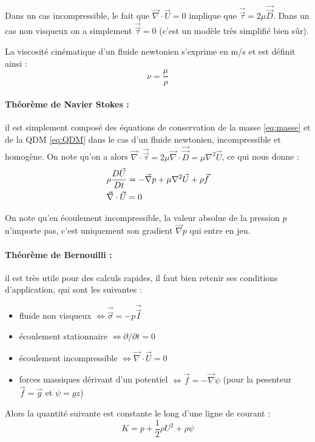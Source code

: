 Dans un cas incompressible, le fait que $\vec{\nabla} \cdot \vec{U} = 0$ implique que $\vec{\vec{\tau}} = 2 \mu \vec{\vec{D}}$. Dans un cas non visqueux on a simplement $\vec{\vec{\tau}} = 0$ (c'est un modèle très simplifié bien sûr).


La viscosité cinématique d'un fluide newtonien s'exprime en m/s et est définit ainsi :
%
\begin{equation}
    \nu = \frac{\mu}{\rho}
\end{equation}

\paragraph{Théorème de Navier Stokes :}il est simplement composé des équations de conservation de la masse \eqref{eq:masse} et de la QDM \eqref{eq:QDM} dans le cas d'un fluide newtonien, incompressible et homogène. On note qu'on a alors $\vec{\nabla} \cdot \vec{\vec{\tau}} = 2 \mu \vec{\nabla} \cdot \vec{\vec{D}} = \mu \nabla^2 \vec{U}$, ce qui nous donne :
%
\begin{align}[left=\empheqlbrace]
    \label{eq:navierstokes}  %
    & \rho \frac{D\vec{U}}{Dt} = - \vec{\nabla} p + \mu  \nabla^2 \vec{U} + \rho \vec{f} \\
    \notag & \vec{\nabla} \cdot \vec{U} = 0
\end{align}

On note qu'en écoulement incompressible, la valeur absolue de la pression $p$ n'importe pas, c'est uniquement son gradient $\vec{\nabla} p$ qui entre en jeu.

\paragraph{Théorème de Bernouilli :}il est très utile pour des calculs rapides, il faut bien retenir ses conditions d'application, qui sont les suivantes :

\begin{itemize}
    \item fluide non visqueux
    $\Leftrightarrow \vec{\vec{\sigma}}=-p\vec{\vec{I}}$
    \item écoulement stationnaire
    $\Leftrightarrow \partial{}/\partial{t} = 0$
    \item écoulement incompressible
    $\Leftrightarrow \vec{\nabla} \cdot \vec{U} = 0$
    \item forces massiques dérivant d'un potentiel
    $\Leftrightarrow\vec{f} = - \vec{\nabla} \psi$ (pour la pesenteur $\vec{f} = \vec{g}$ et $\psi = g z$)
\end{itemize}
%
Alors la quantité suivante est constante le long d'une ligne de courant :
%
\begin{equation}
    K = p + \frac{1}{2}\rho U^2 + \rho\psi
\label{eq:bernouilli}
\end{equation}

